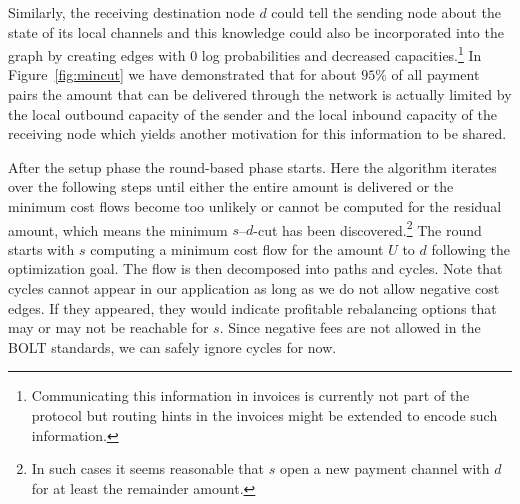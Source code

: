 \documentclass[10pt,twocolumn]{article}
\begin{document}
Similarly, the receiving destination node $d$ could tell the sending node about the state of its local channels and this knowledge could also be incorporated into the graph by creating edges with 0 log probabilities and decreased capacities.\footnote{Communicating this information in invoices is currently not part of the protocol but routing hints in the invoices might be extended to encode such information.} In Figure~\ref{fig:mincut} we have demonstrated that for about $95\%$ of all payment pairs the amount that can be delivered through the network is actually limited by the local outbound capacity of the sender and the local inbound capacity of the receiving node which yields another motivation for this information to be shared.

After the setup phase the round-based phase starts. Here the algorithm iterates over the following steps until either the entire amount is delivered or the minimum cost flows become too unlikely or cannot be computed for the residual amount, which means the minimum $s$--$d$-cut has been discovered.\footnote{In such cases it seems reasonable that $s$ open a new payment channel with $d$ for at least the remainder amount.}
The round starts with $s$ computing a minimum cost flow for the amount $U$ to $d$ following the optimization goal.
The flow is then decomposed into paths and cycles. Note that cycles cannot appear in our application as long as we do not allow negative cost edges. If they appeared, they would indicate profitable rebalancing options that may or may not be reachable for $s$. Since negative fees are not allowed in the BOLT standards, we can safely ignore cycles for now.
\end{document}

